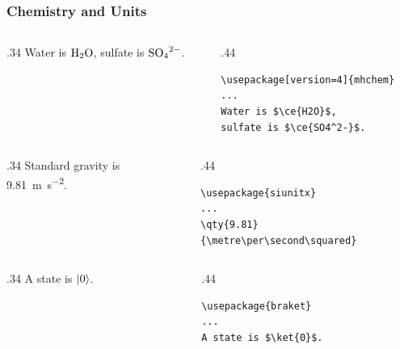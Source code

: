 \documentclass{ltx-talk}
\begin{document}
\begin{frame*}
  \frametitle{Chemistry and Units}
  \begin{columns}
    \begin{column}{.34\textwidth}
      Water is $\ce{H2O}$, sulfate is $\ce{SO4^2-}$.
    \end{column}
    \begin{column}{.44\textwidth}
\small
\begin{verbatim}
\usepackage[version=4]{mhchem}
...
Water is $\ce{H2O}$,
sulfate is $\ce{SO4^2-}$.
\end{verbatim}
    \end{column}
  \end{columns}

  \begin{columns}
    \begin{column}{.34\textwidth}
      Standard gravity is \qty{9.81}{\metre\per\second\squared}.
    \end{column}
    \begin{column}{.44\textwidth}
\small
\begin{verbatim}
\usepackage{siunitx}
...
\qty{9.81}{\metre\per\second\squared}
\end{verbatim}
    \end{column}
  \end{columns}

  \begin{columns}
    \begin{column}{.34\textwidth}
      A state is $\ket{0}$.
    \end{column}
    \begin{column}{.44\textwidth}
\small
\begin{verbatim}
\usepackage{braket}
...
A state is $\ket{0}$.
\end{verbatim}
    \end{column}
  \end{columns}
\end{frame*}
\end{document}
